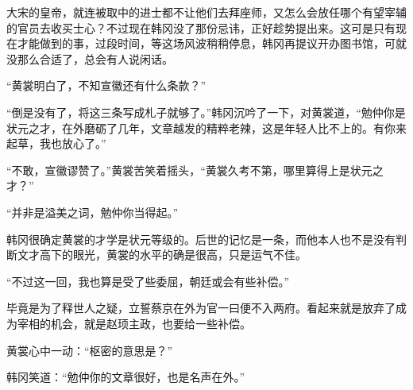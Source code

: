 大宋的皇帝，就连被取中的进士都不让他们去拜座师，又怎么会放任哪个有望宰辅的官员去收买士心？不过现在韩冈没了那份忌讳，正好趁势提出来。这可是只有现在才能做到的事，过段时间，等这场风波稍稍停息，韩冈再提议开办图书馆，可就没那么合适了，总会有人说闲话。

“黄裳明白了，不知宣徽还有什么条款？”

“倒是没有了，将这三条写成札子就够了。”韩冈沉吟了一下，对黄裳道，“勉仲你是状元之才，在外磨砺了几年，文章越发的精粹老辣，这是年轻人比不上的。有你来起草，我也放心了。”

“不敢，宣徽谬赞了。”黄裳苦笑着摇头，“黄裳久考不第，哪里算得上是状元之才？”

“并非是溢美之词，勉仲你当得起。”

韩冈很确定黄裳的才学是状元等级的。后世的记忆是一条，而他本人也不是没有判断文才高下的眼光，黄裳的水平的确是很高，只是运气不佳。

“不过这一回，我也算是受了些委屈，朝廷或会有些补偿。”

毕竟是为了释世人之疑，立誓蔡京在外为官一曰便不入两府。看起来就是放弃了成为宰相的机会，就是赵顼主政，也要给一些补偿。

黄裳心中一动：“枢密的意思是？”

韩冈笑道：“勉仲你的文章很好，也是名声在外。”


